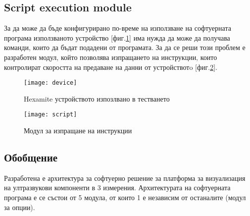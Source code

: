 \subsection{Script execution module}
За да може да бъде конфигурирано по-време на използване на софтуерната програма използваното устройство [фиг.\ref{fig:device}] има нужда да може да получава команди, които да бъдат подадени от програмата. За да се реши този проблем е разработен модул, който позволява изпращането на инструкции, които контролират скоростта на предаване на данни от устройствотo [фиг.\ref{fig:script}].

\begin{figure}
    \centerline{\texttt{[image: device]}}
    \caption{Hexamite устройството изпозлвано в тестването}
    \label{fig:device}
\end{figure}

\begin{figure}
    \centerline{\texttt{[image: script]}}
    \caption{Модул за изпращане на инструкции}
    \label{fig:script}
\end{figure}

\subsection{Обобщение}
Разработена е архитектура за софтуерно решение за платформа за визуализация на ултразвукови компоненти в 3 измерения. Архитектурата на софтуерната програма е се състои от 5 модула, от които 1 е независим от останалите (модул за опции). 